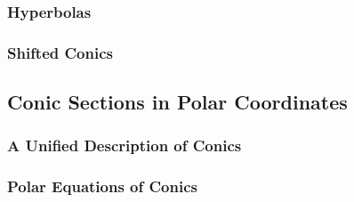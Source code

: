 \subsubsection*{Hyperbolas}

\subsubsection*{Shifted Conics}

\subsection{Conic Sections in Polar Coordinates}

\subsubsection*{A Unified Description of Conics}

\subsubsection*{Polar Equations of Conics}